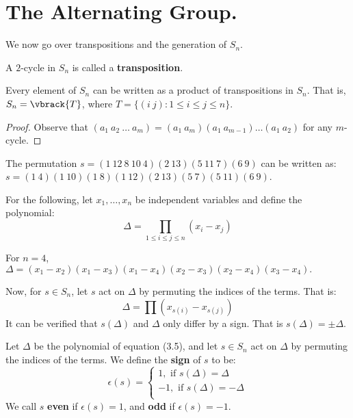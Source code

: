 \section{The Alternating Group.}
\label{section1}

We now go over transpositions and the generation of $S_n$.

\begin{definition}
    A $2$-cycle in  $S_n$ is called a \textbf{transposition}.
\end{definition}

\begin{lemma}\label{3.6.1}
    Every element of $S_n$ can be written as a product of transpositions in
    $S_n$. That is,  $S_n=\vbrack{T}$, where $T=\{(i \ j) : 1 \leq i \leq j \leq
    n\}$.
\end{lemma}
\begin{proof}
    Observe that $(a_1 \ a_2 \ \dots \ a_m)=(a_1 \ a_m)(a_1 \ a_{m-1}) \dots
    (a_1 \ a_2)$ for any $m$-cycle.
\end{proof}

\begin{example}\label{}
    The permutation $s=(1 \ 12 \ 8  \ 10 \ 4)(2 \ 13)(5 \ 11 \ 7)(6 \ 9)$ can be
    written as: $s=(1 \ 4)(1 \ 10)(1 \ 8)(1 \ 12)(2 \ 13)(5 \ 7)(5 \ 11)(6 \
    9)$.
\end{example}

For the following, let $x_1, \dots, x_n$ be independent variables and define the
polynomial:
\begin{equation}
    \Delta=\prod_{1 \leq i \leq j \leq n}{(x_i-x_j)}
\end{equation}

\begin{example}\label{}
    For $n=4$,  $\Delta=(x_1-x_2)(x_1-x_3)(x_1-x_4)(x_2-x_3)(x_2-x_4)(x_3-x_4).$
\end{example}

Now, for $s \in S_n$, let $s$ act on  $\Delta$ by permuting the indices of the
terms. That is:
\begin{equation*}
    \Delta=\prod{(x_{s(i)}-x_{s(j)})}
\end{equation*}
It can be verified that $s(\Delta)$ and $\Delta$ only differ by a sign. That is
 $s(\Delta)=\pm\Delta$.

\begin{definition}
    Let $\Delta$ be the polynomial of equation (3.5), and let $s \in S_n$ act on
     $\Delta$ by permuting the indices of the terms. We define the
     \textbf{sign} of $s$ to be:
     \begin{equation}
         \epsilon(s)=\begin{cases}
                1, \text{ if } s(\Delta)=\Delta \\
               -1, \text{ if } s(\Delta)=-\Delta \\
              \end{cases}
     \end{equation}
     We call $s$  \textbf{even} if $\epsilon(s)=1$, and  \textbf{odd} if
     $\epsilon(s)=-1$.
\end{definition}

